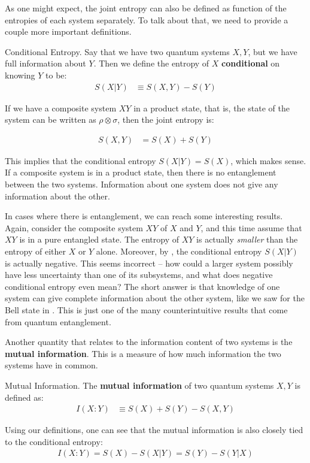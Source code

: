 As one might expect, the joint entropy can also be defined as function of the entropies of each system separately. To talk about that, we need to provide a couple more important definitions.

\begin{definition}{Conditional Entropy.}
    \label{defn:conditional-entropy}
    Say that we have two quantum systems $X,Y$, but we have full information about $Y$. Then we define the entropy of $X$ \textbf{conditional} on knowing $Y$ to be: 
    \begin{align}
        S(X|Y) &\equiv S(X,Y) - S(Y)
    \end{align}
\end{definition}

\begin{example}
    If we have a composite system $XY$ in a product state, that is, the state of the system can be written as $\rho \otimes \sigma$, then the joint entropy is:
\end{example}

\begin{align}
    S(X,Y) &= S(X) + S(Y)
\end{align}

This implies that the conditional entropy $S(X|Y) = S(X)$, which makes sense. If a composite system is in a product state, then there is no entanglement between the two systems. Information about one system does not give any information about the other.

In cases where there is entanglement, we can reach some interesting results. Again, consider the composite system $XY$ of $X$ and $Y$, and this time assume that $XY$ is in a pure entangled state. The entropy of $XY$ is actually \textit{smaller} than the entropy of either $X$ or $Y$ alone. Moreover, by , the conditional entropy $S(X|Y)$ is actually negative. This seems incorrect -- how could a larger system possibly have less uncertainty than one of its subsystems, and what does negative conditional entropy even mean? The short answer is that knowledge of one system can give complete information about the other system, like we saw for the Bell state in . This is just one of the many counterintuitive results that come from quantum entanglement.

Another quantity that relates to the information content of two systems is the \textbf{mutual information}. This is a measure of how much information the two systems have in common.

\begin{definition}{Mutual Information.}
    The \textbf{mutual information} of two quantum systems $X,Y$ is defined as:
    \begin{align}
        I(X:Y) &\equiv S(X) + S(Y) - S(X,Y)
    \end{align}
\end{definition}

Using our definitions, one can see that the mutual information is also closely tied to the conditional entropy:
\begin{align}
        I(X:Y) = S(X) - S(X|Y) = S(Y) - S(Y|X)
\end{align}
